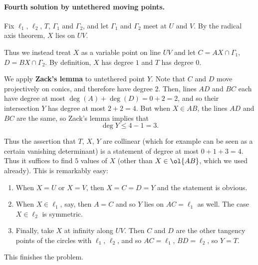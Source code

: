 \documentclass[11pt]{scrartcl}
\begin{document}
\paragraph{Fourth solution by untethered moving points.}
Fix $\ell_1$, $\ell_2$, $T$, $\Gamma_1$ and $\Gamma_2$,
and let $\Gamma_1$ and $\Gamma_2$ meet at $U$ and $V$.
By the radical axis theorem, $X$ lies on $UV$.

Thus we instead treat $X$ as a variable point on line $UV$
and let $C = AX \cap \Gamma_1$, $D = BX \cap \Gamma_2$.
By definition, $X$ has degree $1$ and $T$ has degree $0$.

We apply \textbf{Zack's lemma} to untethered point $Y$.
Note that $C$ and $D$ move projectively on conics,
and therefore have degree $2$.
Then, lines $AD$ and $BC$ each have degree at most $\deg(A)+\deg(D)=0+2=2$,
and so their intersection $Y$ has degree at most $2+2=4$.
But when $X \in AB$, the lines $AD$ and $BC$ are the same,
so Zack's lemma implies that
\[ \deg Y \le 4 - 1 = 3. \]

Thus the assertion that $T$, $X$, $Y$ are collinear
(which for example can be seen as a certain vanishing determinant)
is a statement of degree at most $0+1+3=4$.
Thus it suffices to find $5$ values of $X$
(other than $X \in \ol{AB}$, which we used already).
This is remarkably easy:
\begin{enumerate}
    \item When $X=U$ or $X=V$, then $X=C=D=Y$ and the statement is obvious.
    \item When $X \in \ell_1$, say, then $A=C$ and so $Y$ lies on $AC=\ell_1$ as well.
    The case $X \in \ell_2$ is symmetric.
    \item Finally, take $X$ at infinity along $UV$.
    Then $C$ and $D$ are the other tangency points
    of the circles with $\ell_1$, $\ell_2$, and so $AC=\ell_1$, $BD=\ell_2$, so $Y=T$.
\end{enumerate}
This finishes the problem.
\pagebreak
\end{document}

